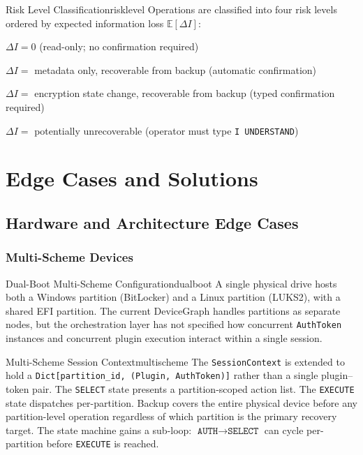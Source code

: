 \documentclass[11pt,a4paper]{report}
\begin{document}
\begin{definition}{Risk Level Classification}{risklevel}
Operations are classified into four risk levels ordered by expected information loss $\mathbb{E}[\Delta I]$:
\begin{description}[noitemsep]
  \item[\texttt{LOW}] $\Delta I = 0$ (read-only; no confirmation required)
  \item[\texttt{MEDIUM}] $\Delta I = $ metadata only, recoverable from backup (automatic confirmation)
  \item[\texttt{HIGH}] $\Delta I = $ encryption state change, recoverable from backup (typed confirmation required)
  \item[\texttt{DESTRUCTIVE}] $\Delta I = $ potentially unrecoverable (operator must type \texttt{I~UNDERSTAND})
\end{description}
\end{definition}

\part{Edge Cases and Solutions}

\chapter{Hardware and Architecture Edge Cases}

\section{Multi-Scheme Devices}

\begin{edgecase}{Dual-Boot Multi-Scheme Configuration}{dualboot}
A single physical drive hosts both a Windows partition (BitLocker) and a Linux partition (LUKS2), with a shared EFI partition. The current DeviceGraph handles partitions as separate nodes, but the orchestration layer has not specified how concurrent \texttt{AuthToken} instances and concurrent plugin execution interact within a single session.
\end{edgecase}

\begin{solution}{Multi-Scheme Session Context}{multischeme}
The \texttt{SessionContext} is extended to hold a \texttt{Dict[partition\_id, (Plugin, AuthToken)]} rather than a single plugin--token pair. The \texttt{SELECT} state presents a partition-scoped action list. The \texttt{EXECUTE} state dispatches per-partition. Backup covers the entire physical device before any partition-level operation regardless of which partition is the primary recovery target. The state machine gains a sub-loop: $\texttt{AUTH} \to \texttt{SELECT}$ can cycle per-partition before \texttt{EXECUTE} is reached.
\end{solution}
\end{document}
